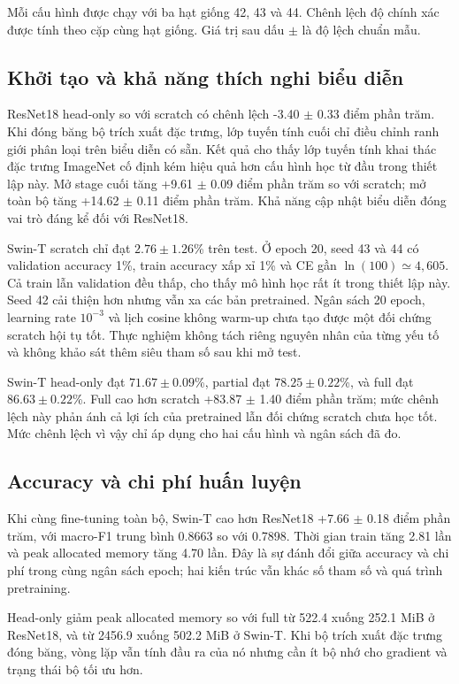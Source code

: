 Mỗi cấu hình được chạy với ba hạt giống 42, 43 và 44. Chênh lệch độ chính xác được tính theo cặp cùng hạt giống. Giá trị sau dấu $\pm$ là độ lệch chuẩn mẫu.

\subsection{Khởi tạo và khả năng thích nghi biểu diễn}
ResNet18 head-only so với scratch có chênh lệch -3.40 $\pm$ 0.33 điểm phần trăm. Khi đóng băng bộ trích xuất đặc trưng, lớp tuyến tính cuối chỉ điều chỉnh ranh giới phân loại trên biểu diễn có sẵn. Kết quả cho thấy lớp tuyến tính khai thác đặc trưng ImageNet cố định kém hiệu quả hơn cấu hình học từ đầu trong thiết lập này. Mở stage cuối tăng +9.61 $\pm$ 0.09 điểm phần trăm so với scratch; mở toàn bộ tăng +14.62 $\pm$ 0.11 điểm phần trăm. Khả năng cập nhật biểu diễn đóng vai trò đáng kể đối với ResNet18.

Swin-T scratch chỉ đạt $2.76 \pm 1.26$\% trên test. Ở epoch 20, seed 43 và 44 có validation accuracy 1\%, train accuracy xấp xỉ 1\% và CE gần $\ln(100)\simeq4{,}605$. Cả train lẫn validation đều thấp, cho thấy mô hình học rất ít trong thiết lập này. Seed 42 cải thiện hơn nhưng vẫn xa các bản pretrained. Ngân sách 20 epoch, learning rate $10^{-3}$ và lịch cosine không warm-up chưa tạo được một đối chứng scratch hội tụ tốt. Thực nghiệm không tách riêng nguyên nhân của từng yếu tố và không khảo sát thêm siêu tham số sau khi mở test.

Swin-T head-only đạt $71.67 \pm 0.09$\%, partial đạt $78.25 \pm 0.22$\%, và full đạt $86.63 \pm 0.22$\%. Full cao hơn scratch +83.87 $\pm$ 1.40 điểm phần trăm; mức chênh lệch này phản ánh cả lợi ích của pretrained lẫn đối chứng scratch chưa học tốt. Mức chênh lệch vì vậy chỉ áp dụng cho hai cấu hình và ngân sách đã đo.

\subsection{Accuracy và chi phí huấn luyện}
Khi cùng fine-tuning toàn bộ, Swin-T cao hơn ResNet18 +7.66 $\pm$ 0.18 điểm phần trăm, với macro-F1 trung bình 0.8663 so với 0.7898. Thời gian train tăng 2.81 lần và peak allocated memory tăng 4.70 lần. Đây là sự đánh đổi giữa accuracy và chi phí trong cùng ngân sách epoch; hai kiến trúc vẫn khác số tham số và quá trình pretraining.

Head-only giảm peak allocated memory so với full từ 522.4 xuống 252.1 MiB ở ResNet18, và từ 2456.9 xuống 502.2 MiB ở Swin-T. Khi bộ trích xuất đặc trưng đóng băng, vòng lặp vẫn tính đầu ra của nó nhưng cần ít bộ nhớ cho gradient và trạng thái bộ tối ưu hơn.

